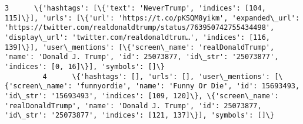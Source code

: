 \documentclass[11pt]{article}
\begin{document}
\begin{Verbatim}[commandchars=\\\{\}]
         3      \{'hashtags': [\{'text': 'NeverTrump', 'indices': [104, 115]\}], 'urls': [\{'url': 'https://t.co/pKSQM8yikm', 'expanded\_url': 'https://twitter.com/realdonaldtrump/status/763950742755434498', 'display\_url': 'twitter.com/realdonaldtrum…', 'indices': [116, 139]\}], 'user\_mentions': [\{'screen\_name': 'realDonaldTrump', 'name': 'Donald J. Trump', 'id': 25073877, 'id\_str': '25073877', 'indices': [0, 16]\}], 'symbols': []\}                                                                                                                                                                                                                                                                                                                                                                                                                                                                                                                                                                                                                                                                                                                                                                                   
         4      \{'hashtags': [], 'urls': [], 'user\_mentions': [\{'screen\_name': 'funnyordie', 'name': 'Funny Or Die', 'id': 15693493, 'id\_str': '15693493', 'indices': [109, 120]\}, \{'screen\_name': 'realDonaldTrump', 'name': 'Donald J. Trump', 'id': 25073877, 'id\_str': '25073877', 'indices': [121, 137]\}], 'symbols': []\}                                                                                                                                                                                                                                                                                                                                                                                                                                                                                                                                                                                                                                                                                                                                                                                                                                                                                                 

\end{Verbatim}
\end{document}
